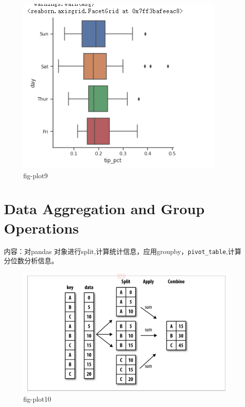 \documentclass{article}
\begin{document}
\begin{figure}[htpb]
	\centering
	\includegraphics[width=\linewidth]{fig/p9}
	\caption{fig-plot9}
	\label{fig-shili9}
\end{figure}


\section[数据聚合分组操作]{Data Aggregation and Group Operations}
内容：对pandas 对象进行split,计算统计信息，应用groupby，\verb|pivot_table|,计算分位数分析信息。
\begin{figure}[htpb]
	\centering
	\includegraphics[width=\linewidth]{fig/p10}
	\caption{fig-plot10}
	\label{fig-shili10}
\end{figure}
\end{document}
